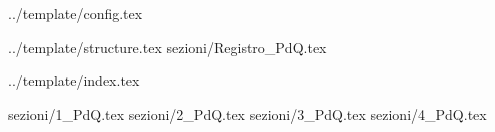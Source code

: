  {../template/config.tex}


\def\DOCUMENTO{Piano di Qualifica}
\def\VERSIONE{1.0.0}

\def\DESCRIZIONE{<Info documento>}

\def\REDATTORE {<Redattore>}
\def\VERIFICATORE {<Verificatore>}
\def\RESPONSABILE {<Responsabile>}

\def\USO {<Uso>}

\def\DISTRIBUZIONE {\GRUPPO{}\\ & \COMMITTENTE{}\\}

\def\DESCRIZIONE {Documento riguardante l'insieme di strategie di verifica adottate dal gruppo 
StarkLabs per il conseguimento di requisiti qualitativi per il progetto SiVoDiM.}
 {../template/structure.tex}
 {sezioni/Registro_PdQ.tex}

\def\INDICE	{true}
\def\TABELLE {true}
\def\FIGURE {true}


 {../template/index.tex}

 {sezioni/1_PdQ.tex}
 {sezioni/2_PdQ.tex}
 {sezioni/3_PdQ.tex}
 {sezioni/4_PdQ.tex}





